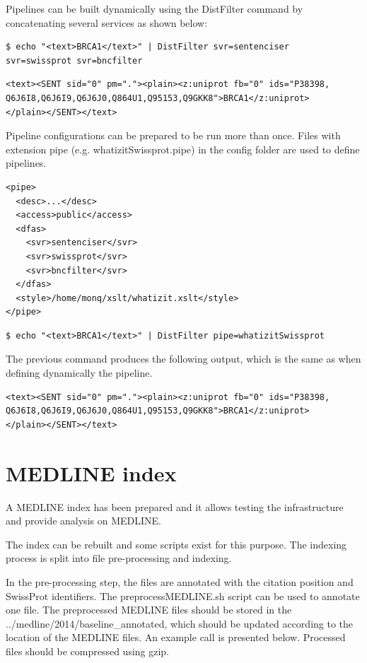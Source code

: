\documentclass{report}
\begin{document}
Pipelines can be built dynamically using the DistFilter command by concatenating several services as shown below:

\begin{verbatim}
$ echo "<text>BRCA1</text>" | DistFilter svr=sentenciser 
svr=swissprot svr=bncfilter
\end{verbatim}

\begin{verbatim}
<text><SENT sid="0" pm="."><plain><z:uniprot fb="0" ids="P38398,
Q6J6I8,Q6J6I9,Q6J6J0,Q864U1,Q95153,Q9GKK8">BRCA1</z:uniprot>
</plain></SENT></text>
\end{verbatim}


Pipeline configurations can be prepared to be run more than once.
Files with extension pipe (e.g. whatizitSwissprot.pipe) in the config folder are used to define pipelines.

\begin{verbatim}
<pipe>
  <desc>...</desc>
  <access>public</access>
  <dfas>
    <svr>sentenciser</svr>
    <svr>swissprot</svr>
    <svr>bncfilter</svr>
  </dfas>
  <style>/home/monq/xslt/whatizit.xslt</style>
</pipe>
\end{verbatim}

\begin{verbatim}
$ echo "<text>BRCA1</text>" | DistFilter pipe=whatizitSwissprot
\end{verbatim}

The previous command produces the following output, which is the same as when defining dynamically the pipeline.

\begin{verbatim}
<text><SENT sid="0" pm="."><plain><z:uniprot fb="0" ids="P38398,
Q6J6I8,Q6J6I9,Q6J6J0,Q864U1,Q95153,Q9GKK8">BRCA1</z:uniprot>
</plain></SENT></text>
\end{verbatim}


\section{MEDLINE index}

A MEDLINE index has been prepared and it allows testing the infrastructure and provide analysis on MEDLINE.

The index can be rebuilt and some scripts exist for this purpose.
The indexing process is split into file pre-processing and indexing.

In the pre-processing step, the files are annotated with the citation position and SwissProt identifiers.
The preprocessMEDLINE.sh script can be used to annotate one file.
The preprocessed MEDLINE files should be stored in the ../medline/2014/baseline\_annotated, which should be updated according to the location of the MEDLINE files.
An example call is presented below.
Processed files should be compressed using gzip.
\end{document}
